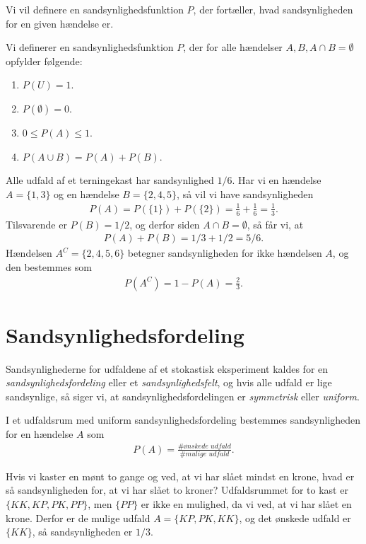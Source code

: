 Vi vil definere en sandsynlighedsfunktion $P$, der fortæller, hvad sandsynligheden for en given hændelse er.
\begin{defn}
Vi definerer en sandsynlighedsfunktion $P$, der for alle hændelser $A,B, A\cap B = \emptyset$ opfylder følgende:
\begin{enumerate}[label=\roman*)]
\item $P(U)=1$.
\item $P(\emptyset) = 0$.
\item $0 \leq P(A) \leq 1$.
\item $P(A \cup B) = P(A) + P(B)$.
\end{enumerate}
\end{defn}
\begin{exa}
Alle udfald af et terningekast har sandsynlighed $1/6$. Har vi en hændelse $A= \{1,3\}$ og en hændelse $B= \{2,4,5\}$, så vil vi have sandsynligheden
\begin{align*}
P(A) = P(\{1\}) + P(\{2\}) =  \frac{1}{6} + \frac{1}{6} = \frac{1}{3}.
\end{align*}
Tilsvarende er $P(B) = 1/2$, og derfor siden $A \cap B = \emptyset$, så får vi, at
\begin{align*}
P(A)+P(B) = 1/3+1/2 = 5/6.
\end{align*}
Hændelsen $A^C=\{2,4,5,6\}$ betegner sandsynligheden for ikke hændelsen $A$, og den bestemmes som
\begin{align*}
P(A^C) = 1-P(A) = \frac{2}{3}.
\end{align*}  
\end{exa}
\section*{Sandsynlighedsfordeling}

Sandsynlighederne for udfaldene af et stokastisk eksperiment kaldes for en \textit{sandsynlighedsfordeling} eller et \textit{sandsynlighedsfelt}, og hvis alle udfald er lige sandsynlige, så siger vi, at sandsynlighedsfordelingen er \textit{symmetrisk} eller \textit{uniform}.
\begin{setn}
I et udfaldsrum med uniform sandsynlighedsfordeling bestemmes sandsynligheden for en hændelse $A$ som
\begin{align*}
P(A) = \frac{\# \textit{ønskede udfald}}{\# \textit{mulige udfald}}.
\end{align*}
\end{setn}
\begin{exa}
Hvis vi kaster en mønt to gange og ved, at vi har slået mindst en krone, hvad er så sandsynligheden for, at vi har slået to kroner?
Udfaldsrummet for to kast er $\{KK,KP,PK,PP\}$, men $\{PP\}$ er ikke en mulighed, da vi ved, at vi har slået en krone. Derfor er de mulige udfald $A=\{KP,PK,KK\}$, og det ønskede udfald er $\{KK\}$, så sandsynligheden er $1/3$. 
\end{exa}

